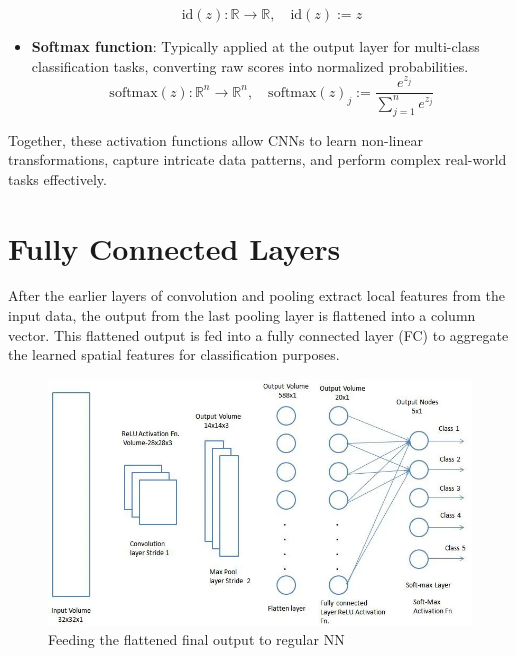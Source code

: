 \begin{itemize}
    \begin{equation}
        \text{id}(z): \mathbb{R} \to \mathbb{R}, \quad \text{id}(z) := z
        \label{eqn:9}
    \end{equation}
    \item \textbf{Softmax function}: Typically applied at the output layer for multi-class classification tasks, converting raw scores into normalized probabilities.
    \begin{equation}
        \text{softmax}(z) : \mathbb{R}^n \to \mathbb{R}^n, \quad \text{softmax}(z)_j := \frac{e^{z_j}}{\sum_{j=1}^n e^{z_j}}
        \label{eqn:10}
    \end{equation}
\end{itemize}

Together, these activation functions allow CNNs to learn non-linear transformations, capture intricate data patterns, and perform complex real-world tasks effectively.

\section{Fully Connected Layers}
After the earlier layers of convolution and pooling extract local features from the input data, the output from the last pooling layer is flattened into a column vector. This flattened output is fed into a fully connected layer (FC) to aggregate the learned spatial features for classification purposes.\\

\begin{figure}[h!]
    \centering
    \includegraphics[width=\textwidth]{images/figure13.png}
    \caption{Feeding the flattened final output to regular NN}
    \label{fig:13}
\end{figure}

